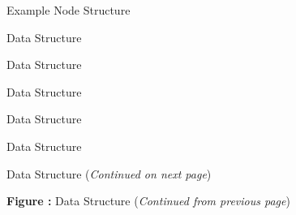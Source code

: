 \newpage
\setlength{\unitlength}{\baselineskip}	%
\begin{figure}[!htp]
\centering
\resizebox{\linewidth}{!}{}
\caption{Example Node Structure}
\label{f:example_node}
\end{figure}

\clearpage
\begin{figure}[!htp]
\centering

\caption{ Data Structure}
\label{f:ArbitraryGridMotion}
\end{figure}

\clearpage
\begin{figure}[!htp]
\centering

\caption{ Data Structure}
\label{f:Area}
\end{figure}

\clearpage
\begin{figure}[!htp]
\centering

\caption{ Data Structure}
\label{f:AverageInterface}
\end{figure}

\clearpage
\begin{figure}[!htp]
\centering
%
\resizebox{\linewidth}{!}{}
\caption{ Data Structure}
\label{f:Axisymmetry}
\end{figure}

\clearpage
\begin{figure}[!htp]
\centering

\caption{ Data Structure}
\label{f:BaseIterativeData}
\end{figure}


\clearpage
\begin{figure}[!htp]
\centering
\resizebox{\linewidth}{!}{}
\caption[ Data Structure]{ Data Structure (\textit{Continued on next page})}
\label{f:BC}
\end{figure}
\clearpage
\begin{figure}[!htp]
\centering
\resizebox{\linewidth}{!}{}
\par\vspace{\abovecaptionskip}
\textbf{Figure :}  Data Structure (\textit{Continued from previous page})
\end{figure}

